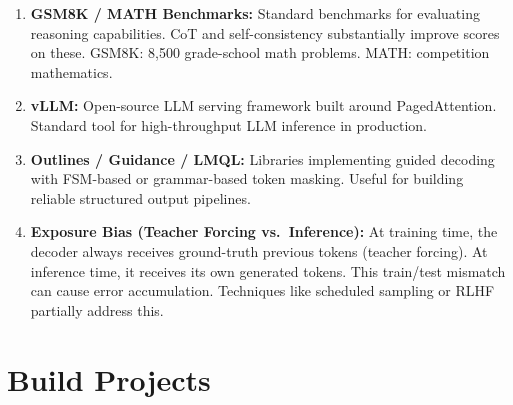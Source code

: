 \documentclass[11pt, a4paper]{article}
\begin{document}
\begin{enumerate}[leftmargin=2em]
  \item \textbf{GSM8K / MATH Benchmarks:} Standard benchmarks for evaluating reasoning capabilities. CoT and self-consistency substantially improve scores on these. GSM8K: 8,500 grade-school math problems. MATH: competition mathematics.

  \item \textbf{vLLM:} Open-source LLM serving framework built around PagedAttention. Standard tool for high-throughput LLM inference in production.

  \item \textbf{Outlines / Guidance / LMQL:} Libraries implementing guided decoding with FSM-based or grammar-based token masking. Useful for building reliable structured output pipelines.

  \item \textbf{Exposure Bias (Teacher Forcing vs.\ Inference):} At training time, the decoder always receives ground-truth previous tokens (teacher forcing). At inference time, it receives its own generated tokens. This train/test mismatch can cause error accumulation. Techniques like scheduled sampling or RLHF partially address this.
\end{enumerate}

\newpage
\section{Build Projects}
\end{document}
